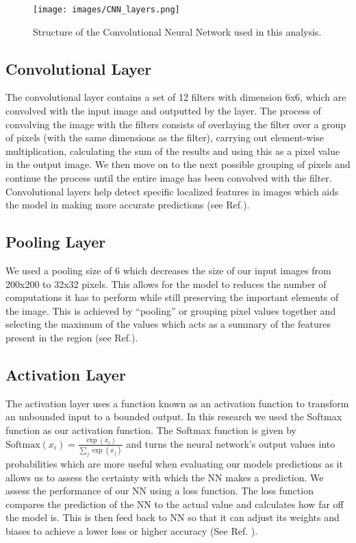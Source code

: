 \documentclass[conference]{IEEEtran}
\begin{document}
\begin{figure}[ht!]
  \centering
  \texttt{[image: images/CNN\_layers.png]}
  \caption{Structure of the Convolutional Neural Network used in this analysis.}
  \label{fig:CNN_layers}

\end{figure}

\subsection{Convolutional Layer}
The convolutional layer contains a set of 12 filters with dimension 6x6,  which are convolved with the input image and outputted by the layer. The process of convolving the image with the filters consists of overlaying the filter over a group of pixels (with the same dimensions as the filter), carrying out element-wise multiplication, calculating the sum of the results and using this as a pixel value in the output image. We then move on to the next possible grouping of pixels and continue the process until the entire image has been convolved with the filter. Convolutional layers help detect specific localized features in images which aids the model in making more accurate predictions (see Ref.\cite{CNNPart1_VZ_2019}).
\subsection{Pooling Layer}
We used a pooling size of 6 which decreases the size of  our input images from 200x200 to 32x32 pixels. This allows for the model to reduces the number of computations it has to perform while still preserving the important elements of the image. This is achieved by “pooling” or grouping pixel values together and selecting the maximum of the values which acts as a summary of the features present in the region (see Ref.\cite{CNNPart1_VZ_2019}).
\subsection{Activation Layer}
The activation layer uses a function known as an activation function to transform an unbounded input to a bounded output. In this research we used the Softmax function as our activation function. The Softmax function is given by $\text{Softmax}(x_{i}) = \frac{\exp(x_i)}{\sum_j \exp(x_j)}$ and turns the neural network's output values into probabilities which are more useful when evaluating our models predictions as it allows us to assess the certainty with which the NN makes a prediction. We assess the performance of our NN using a loss function. The loss function compares the prediction of the NN to the actual value and calculates how far off the model is. This is then feed back to NN so that it can adjust its weights and biases to achieve a lower loss or higher accuracy (See Ref. \cite{Softmax}).
\end{document}
